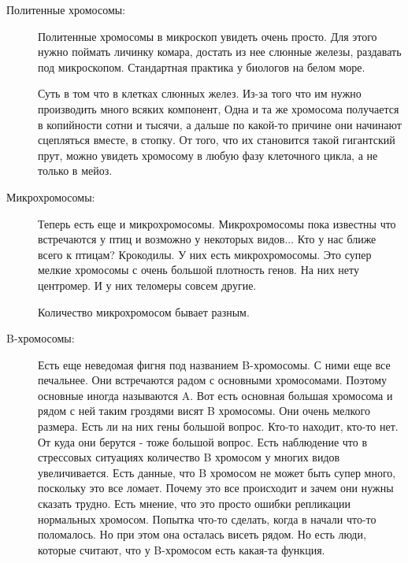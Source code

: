 \begin{description}
\item[Политенные хромосомы:]
Политенные хромосомы в микроскоп увидеть очень просто. Для этого 
нужно поймать личинку комара, достать из нее слюнные железы, 
раздавать под микроскопом. Стандартная практика у биологов на белом море. 

Суть в том что в клетках слюнных желез. Из-за
того что им нужно производить много всяких компонент, 
Одна и та же хромосома получается в копийности
сотни и тысячи, а дальше по какой-то причине они 
начинают сцепляться вместе, в стопку. От того, что 
их становится такой гигантский прут, можно увидеть 
хромосому в любую фазу клеточного цикла, 
а не только в мейоз.

\item[Микрохромосомы:]
Теперь есть еще и микрохромосомы. Микрохромосомы пока известны что встречаются 
у птиц и возможно у некоторых видов... Кто у нас ближе всего к птицам? 
Крокодилы. У них есть микрохромосомы. Это супер мелкие хромосомы 
с очень большой плотность генов. На них нету центромер. И у них 
теломеры совсем другие. 

Количество микрохромосом бывает разным.

\item[B-хромосомы:]
Есть еще неведомая фигня под названием B-хромосомы. С ними еще
все печальнее. Они встречаются радом с основными хромосомами.
Поэтому основные иногда называются A. Вот есть основная большая
хромосома и рядом с ней таким гроздями висят B хромосомы. Они очень мелкого
размера. Есть ли на них гены большой вопрос. Кто-то находит, кто-то нет. От куда
они берутся - тоже большой вопрос. Есть наблюдение что в
стрессовых ситуациях количество B хромосом у многих
видов увеличивается. Есть данные, что B хромосом не может
быть супер много, поскольку это все ломает. Почему это все происходит и
зачем они нужны сказать трудно. Есть мнение, что это просто ошибки репликации
нормальных хромосом. Попытка что-то сделать, когда в начали что-то
поломалось. Но при этом она осталась висеть рядом. Но есть люди, которые
считают, что у B-хромосом есть какая-та функция. 
\end{description}

